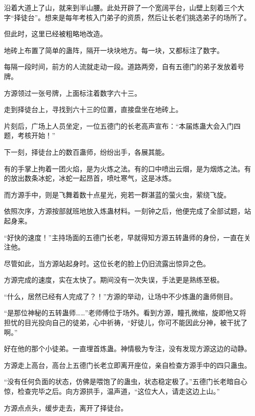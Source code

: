 
\begin{this_body}



沿着大道上了山，就来到半山腰。此处开辟了一个宽阔平台，山壁上刻着三个大字“择徒台”。想来是每年考核入门弟子的资质，然后让长老们挑选弟子的场所了。

但此时，这里已经被粗略地改造。

地砖上布置了简单的蛊阵，隔开一块块地方。每一块，又都标注了数字。

每隔一段时间，前方的人流就走动一段。道路两旁，自有五德门的弟子发放着号牌。

方源领过一张号牌，上面标注着数字六十三。

走到择徒台上，寻找到六十三的位置，直接盘坐在地砖上。

片刻后，广场上人员坐定，一位五德门的长老高声宣布：“本届炼蛊大会入门四题，考核开始！”

下一刻，择徒台上的数百蛊师，纷纷出手，各展其能。

有的手掌上拘着一团火焰，是为火炼之法。有的口中喷出云烟，是为烟炼之法。有的放出数条冰蛇，冰蛇一起昂首，喷吐寒气，这是冰炼。

而方源手中，则是飞舞着数十点星光，宛若一群湛蓝的萤火虫，萦绕飞旋。

依照次序，方源按部就班地放入炼蛊材料。一刻钟之后，他便完成了全部试题，站起身来。

“好快的速度！”主持场面的五德门长老，早就得知方源五转蛊师的身份，一直在关注他。

尽管如此，当方源站起身时。这位长老的脸上仍旧流露出惊异之色。

方源完成的速度，实在太快了。期间没有一次失误，手法更是熟练至极。

“什么，居然已经有人完成了？！”方源的举动，让场中不少炼蛊的蛊师侧目。

“是那位神秘的五转蛊师……”老师傅位于场外。看到方源，瞳孔微缩，旋即他又将担忧的目光投向自己的徒弟，心中祈祷，“好徒儿，你可不能因此分神，被干扰了啊。”

好在他的那个小徒弟。一直埋首炼蛊。神情极为专注，没有发现方源这边的动静。

方源走上高台，高台上五德门长老立即离开座位，亲自检查方源手中的四只蛊虫。

“没有任何负面的状态，仿佛是喂饱了的蛊虫，状态稳定极了。”五德门长老暗自心惊，检查完毕之后。向方源拱手，温声道，“这位大人，请走这边上山。”

方源点点头，缓步走去，离开了择徒台。


\end{this_body}
